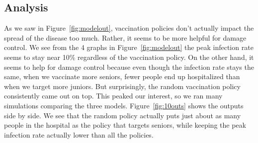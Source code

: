 \documentclass[titlepage]{article}
\begin{document}
\subsection{Analysis}
\par As we saw in Figure~\ref{fig:modelout}, vaccination policies don't actually impact the spread of the disease too much. Rather, it seems to be more helpful for damage control. We see from the 4 graphs in Figure~\ref{fig:modelout} the peak infection rate seems to stay near 10\% regardless of the vaccination policy. On the other hand, it seems to help for damage control because even though the infection rate stays the same, when we vaccinate more seniors, fewer people end up hospitalized than when we target more juniors. But surprisingly, the random vaccination policy consistently came out on top. This peaked our interest, so we ran many simulations comparing the three models. Figure~\ref{fig:10outs} shows the outputs side by side. We see that the random policy actually puts just about as many people in the hospital as the policy that targets seniors, while keeping the peak infection rate actually lower than all the policies.
\end{document}
